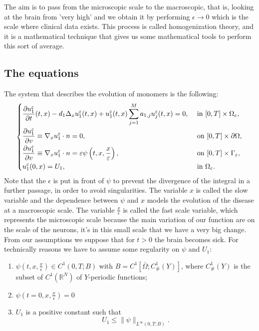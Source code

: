 The aim is to pass from the microscopic scale to the macroscopic, that is, looking at the brain from 'very high' and we obtain it by performing $\epsilon \rightarrow 0$ which is the scale where clinical data exists. This process is called homogenization theory, and it is a mathematical technique that gives us some mathematical tools to perform this sort of average.
\subsection{The equations}
The system that describes the evolution of monomers is the following:
\begin{equation}
    \begin{dcases}
    \frac{\partial u_{1}^{\epsilon}}{\partial t}(t, x)-d_{1} \Delta_{x} u_{1}^{\epsilon}(t, x)+u_{1}^{\epsilon}(t, x) \sum_{j=1}^{M} a_{1, j} u_{j}^{\epsilon}(t, x)=0, & \text { in }[0, T] \times \Omega_{\epsilon},\\
    \frac{\partial u^{\epsilon}_1}{\partial v} \equiv \nabla_{x} u^{\epsilon}_1\cdot n=0, & \text { on }[0, T]\times\partial\Omega,\\
    \frac{\partial u^{\epsilon}_{1}}{\partial v} \equiv \nabla_{x} u^{\epsilon}_1 \cdot n=\epsilon \psi\left(t, x,\frac{x}{\epsilon}\right), & \text { on }[0, T] \times \Gamma_{\epsilon},\\
    u_{1}^{\epsilon}(0, x)=U_{1}, & \text{ in }\Omega_{\epsilon}.
    \end{dcases}
\label{eq:u_1_eqs}\end{equation}
Note that the $\epsilon$ is put in front of $\psi$ to prevent the divergence of the integral in a further passage, in order to avoid singularities. 
The variable $x$ is called the slow variable and the dependence between $\psi$ and $x$ models the evolution of the disease at a macroscopic scale. The variable
$\frac{x}{\epsilon}$ is called the fast scale variable, which represents the microscopic scale because the main variation of our function are on the scale of the neurons, it's in this small scale that we have a very big change.\\
From our assumptions we suppose that for $t>0$ the brain becomes sick. For technically reasons we have to assume some regularity on $\psi$ and $U_1$:
\begin{enumerate}
    \item $\psi\left(t, x, \frac{x}{\epsilon}\right) \in C^{1}(0, T ; B)$ with $B=C^{1}\left[\bar{\Omega} ; C_{\text {\# }}^{1}(Y)\right]$, where $C_{\#}^{1}(Y)$ is the subset of $C^{1}\left(\mathbb{R}^{N}\right)$ of $Y$-periodic functions;
    \item $\psi\left(t=0, x, \frac{x}{\epsilon}\right)=0$
    \item 
$U_{1}$ is a positive constant such that
\begin{equation}
  U_{1} \leq\|\psi\|_{L^{\infty}(0, T ; B)} .
\label{eq:U_1_norm}\end{equation}
\end{enumerate}
